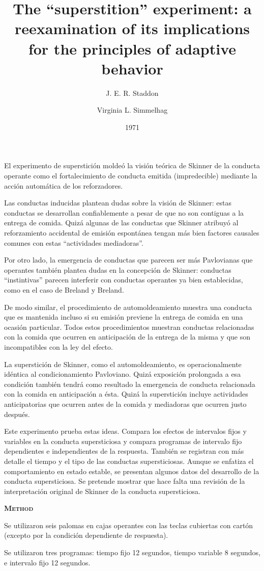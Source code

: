 \documentclass[a4paper,12pt]{article}
\title{The ``superstition'' experiment: a reexamination of its implications for the principles of adaptive behavior}
\author{J. E. R. Staddon \and Virginia L. Simmelhag}
\date{1971}
\begin{document}
{\scshape\bfseries \maketitle}

El experimento de superstición moldeó la visión teórica de Skinner de la conducta operante como el fortalecimiento de conducta emitida (impredecible) mediante la acción automática de los reforzadores. 

Las conductas inducidas plantean dudas sobre la visión de Skinner: estas conductas se desarrollan confiablemente  a pesar de que no son contiguas a la entrega de comida. Quizá algunas de las conductas que Skinner atribuyó al reforzamiento accidental de emisión espontánea tengan más bien factores causales comunes con estas ``actividades mediadoras''.

Por otro lado, la emergencia de conductas que parecen ser más Pavlovianas que operantes también plantea dudas en la concepción de Skinner: conductas ``instintivas'' parecen interferir con conductas operantes ya bien establecidas, como en el caso de Breland y Breland.

De modo similar, el procedimiento de automoldeamiento muestra una conducta que es mantenida incluso si su emisión previene la entrega de comida en una ocasión particular. Todos estos procedimientos muestran conductas relacionadas con la comida que ocurren en anticipación de la entrega de la misma y que son incompatibles con la ley del efecto.

La superstición de Skinner, como el automoldeamiento, es operacionalmente idéntica al condicionamiento Pavloviano. Quizá exposición prolongada a esa condición también tendrá como resultado la emergencia de conducta relacionada con la comida en anticipación a ésta. Quizá la superstición incluye actividades anticipatorias que ocurren antes de la comida y mediadoras que ocurren justo después.

Este experimento prueba estas ideas. Compara los efectos de intervalos fijos y variables en la conducta supersticiosa y compara programas de intervalo fijo dependientes e independientes de la respuesta. También se registran con más detalle el tiempo y el tipo de las conductas supersticiosas. Aunque se enfatiza el comportamiento en estado estable, se presentan algunos datos del desarrollo de la conducta supersticiosa. Se pretende mostrar que hace falta una revisión de la interpretación original de Skinner de la conducta supersticiosa.

{\scshape\bfseries Method}

Se utilizaron seis palomas en cajas operantes con las teclas cubiertas con cartón (excepto por la condición dependiente de respuesta).

Se utilizaron tres programas: tiempo fijo 12 segundos, tiempo variable 8 segundos, e intervalo fijo 12 segundos.
\end{document}
